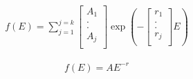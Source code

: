 \documentclass[%
 aip,
rsi,%
 amsmath,amssymb,
 reprint,%
]{revtex4-1}
\begin{document}
\begin{eqnarray}
	f(E) =
    \sum^{j=k}_{j=1}
    \left[
    \begin{array}{c}
    	A_1 	\\
        . 		\\
        . 		\\
        A_j 	\\
    \end{array}
    \right]
    \operatorname{exp}\left(-\left[
    \begin{array}{c}
    	r_1 	\\
        . 		\\
        . 		\\
        r_j 	\\
    \end{array}
    \right]E\right)
    \label{eq:exp_fun}
\end{eqnarray}

\begin{eqnarray}
	f(E) = AE^{-r}
    \label{eq:pow_law}
\end{eqnarray}
\end{document}
